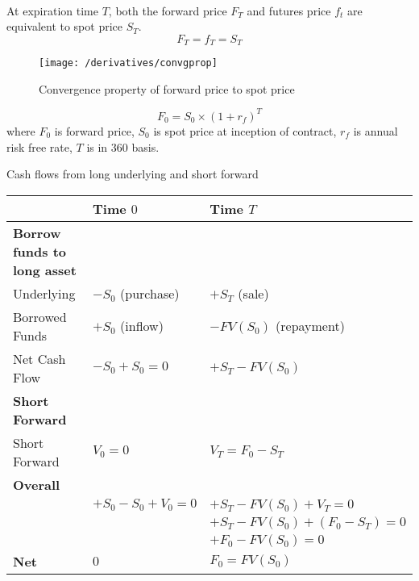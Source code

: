 \begin{remark} \\
At expiration time $T$, both the forward price $F_T$ and futures price $f_t$ are equivalent to spot price $S_T$.
\begin{equation}
F_T = f_T = S_T \nonumber
\end{equation}
\end{remark}

\begin{figure}[H]
\centering
\texttt{[image: /derivatives/convgprop]}
\caption{Convergence property of forward price to spot price}
\end{figure}

\begin{definition} 
\begin{equation}
F_0 = S_0 \times (1+r_f)^T \nonumber
\end{equation}
where $F_0$ is forward price, $S_0$ is spot price at inception of contract, $r_f$ is annual risk free rate, $T$ is in $360$ basis.
\end{definition}

\begin{flushleft}
Cash flows from long underlying and short forward
\begin{tabularx}{\textwidth}{X|X|X}
\hline
\rowcolor{gray!30}
& Time $0$ & Time $T$ \\
\hline
\textbf{Borrow funds to long asset} & & \\
Underlying & $-S_0$ (purchase) & $+S_T$ (sale) \\
Borrowed Funds & $+S_0$ (inflow) & $-FV(S_0)$ (repayment) \\
Net Cash Flow & $-S_0 + S_0 = 0$ & $+S_T - FV(S_0)$ \\
\textbf{Short Forward} & & \\
Short Forward & $V_0 = 0$ & $V_T = F_0 - S_T$ \\
\textbf{Overall} & & \\
& $+S_0 - S_0 + V_0 = 0$ & $+S_T - FV(S_0) + V_T = 0$\\
& & $+S_T - FV(S_0) + (F_0 - S_T) = 0$\\
& & $+F_0 - FV(S_0) = 0$\\
\textbf{Net} & $0$ & $F_0 = FV(S_0)$\\
\hline 
\end{tabularx}
\end{flushleft}

